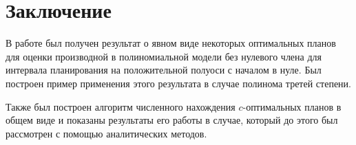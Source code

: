 \documentclass[specialist,
               substylefile = spbu.rtx,
               subf,href,colorlinks=true, 12pt]{disser}
\theoremstyle{definition}
\begin{document}
  
	
\chapter*{Заключение}
	В работе был получен результат о явном виде некоторых оптимальных планов для оценки производной в полиномиальной модели без нулевого члена для интервала планирования на положительной полуоси с началом в нуле. Был построен пример применения этого результата в случае полинома третей степени.
	
	Также был построен алгоритм численного нахождения $c$-оптимальных планов в общем виде и показаны результаты его работы в случае, который до этого был рассмотрен с помощью аналитических методов.
	
	
	
	
	
	
\end{document}
